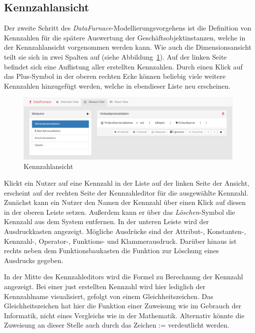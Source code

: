 \documentclass[
  language=german, %
  type=bachelor,%
  ngerman
]{isthesis}
\begin{document}
\begin{content}
  \subsection{Kennzahlansicht}\label{subsec:kennzahlansicht}

  Der zweite Schritt des \textit{DataFurnace}-Modellierungsvorgehens ist die
  Definition von Kennzahlen für die spätere Auswertung der
  Geschäftsobjektinstanzen, welche in der Kennzahlansicht vorgenommen werden
  kann. Wie auch die Dimensionsansicht teilt sie sich in zwei Spalten auf
  (siehe Abbildung~\ref{kennzahlansicht}). Auf der linken Seite befindet sich
  eine Auflistung aller erstellten Kennzahlen.  Durch einen Klick auf das
  Plus-Symbol in der oberen rechten Ecke können beliebig viele weitere
  Kennzahlen hinzugefügt werden, welche in ebendieser Liste neu erscheinen.

  \begin{figure}
    \includegraphics[scale=0.35]{content/figures/measure-view.png}
    \caption{Kennzahlansicht}\label{kennzahlansicht}
  \end{figure}

  Klickt ein Nutzer auf eine Kennzahl in der Liste auf der linken Seite der
  Ansicht, erscheint auf der rechten Seite der Kennzahleditor für die
  ausgewählte Kennzahl. Zunächst kann ein Nutzer den Namen der Kennzahl über
  einen Klick auf diesen in der oberen Leiste setzen. Außerdem kann er über das
  \textit{Löschen}-Symbol die Kennzahl aus dem System entfernen. In der unteren
  Leiste wird der Ausdruckkasten angezeigt. Mögliche Ausdrücke sind der
  \mbox{Attribut-,} \mbox{Konstanten-,} \mbox{Kennzahl-,} \mbox{Operator-,}
  Funktions- und Klammerausdruck.  Darüber hinaus ist rechts neben dem
  Funktionsbaukasten die Funktion zur Löschung eines Ausdrucks gegeben.

  In der Mitte des Kennzahleditors wird die Formel zu Berechnung der Kennzahl
  angezeigt. Bei einer just erstellten Kennzahl wird hier lediglich der
  Kennzahlname visualisiert, gefolgt von einem Gleichheitszeichen. Das
  Gleichheitszeichen hat hier die Funktion einer Zuweisung wie im Gebrauch
  der Informatik, nicht eines Vergleichs wie in der Mathematik.
  Alternativ könnte die Zuweisung an dieser Stelle auch durch das Zeichen
  \glqq{}\mbox{:=}\grqq{} verdeutlicht werden. 
  

\end{content}
\end{document}
